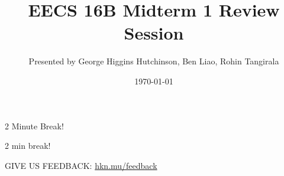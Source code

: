 

\title{EECS 16B Midterm 1 Review Session}
\author{Presented by George Higgins Hutchinson, Ben Liao, Rohin Tangirala}
\date{\today}

\newcommand{\SlideAccessingLogistics}{\@691}










\begin{frame}
    2 Minute Break!
\end{frame}



	\begin{frame}
	    2 min break!

        GIVE US FEEDBACK: \url{hkn.mu/feedback}
	\end{frame}


	

